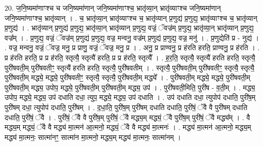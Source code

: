 \documentclass[17pt]{extarticle}
\begin{document}
20. ज॒नि॒ष्यमा॑णाꣳश्च च जनि॒ष्यमा॑णान् जनि॒ष्यमा॑णाꣳश्च॒ भ्रातृ॑व्या॒न् भ्रातृ॑व्याꣳश्च जनि॒ष्यमा॑णान् जनि॒ष्यमा॑णाꣳश्च॒ भ्रातृ॑व्यान् । . च॒ भ्रातृ॑व्या॒न् भ्रातृ॑व्याꣳश्च च॒ भ्रातृ॑व्यान् प्र॒णुद्य॑ प्र॒णुद्य॒ भ्रातृ॑व्याꣳश्च च॒ भ्रातृ॑व्यान् प्र॒णुद्य॑ । . भ्रातृ॑व्यान् प्र॒णुद्य॑ प्र॒णुद्य॒ भ्रातृ॑व्या॒न् भ्रातृ॑व्यान् प्र॒णुद्य॒ वज्रं॒ ॅवज्र॑म् प्र॒णुद्य॒ भ्रातृ॑व्या॒न् भ्रातृ॑व्यान् प्र॒णुद्य॒ वज्र᳚म् । . प्र॒णुद्य॒ वज्रं॒ ॅवज्र॑म् प्र॒णुद्य॑ प्र॒णुद्य॒ वज्र॒ मन्वनु॒ वज्र॑म् प्र॒णुद्य॑ प्र॒णुद्य॒ वज्र॒ मनु॑ । . प्र॒णुद्येति॑ प्र - नुद्य॑ । . वज्र॒ मन्वनु॒ वज्रं॒ ॅवज्र॒ मनु॒ प्र प्राणु॒ वज्रं॒ ॅवज्र॒ मनु॒ प्र । . अनु॒ प्र प्राण्वनु॒ प्र ह॑रति हरति॒ प्राण्वनु॒ प्र ह॑रति । . प्र ह॑रति हरति॒ प्र प्र ह॑रति॒ स्तृत्यै॒ स्तृत्यै॑ हरति॒ प्र प्र ह॑रति॒ स्तृत्यै᳚ । . ह॒र॒ति॒ स्तृत्यै॒ स्तृत्यै॑ हरति हरति॒ स्तृत्यै॒ पुरी॑षवती॒म् पुरी॑षवतीꣳ॒॒ स्तृत्यै॑ हरति हरति॒ स्तृत्यै॒ पुरी॑षवतीम् । . स्तृत्यै॒ पुरी॑षवती॒म् पुरी॑षवतीꣳ॒॒ स्तृत्यै॒ स्तृत्यै॒ पुरी॑षवती॒म् मद्ध्ये॒ मद्ध्ये॒ पुरी॑षवतीꣳ॒॒ स्तृत्यै॒ स्तृत्यै॒ पुरी॑षवती॒म् मद्ध्ये᳚ । . पुरी॑षवती॒म् मद्ध्ये॒ मद्ध्ये॒ पुरी॑षवती॒म् पुरी॑षवती॒म् मद्ध्य॒ उपोप॒ मद्ध्ये॒ पुरी॑षवती॒म् पुरी॑षवती॒म् मद्ध्य॒ उप॑ । . पुरी॑षवती॒मिति॒ पुरी॑ष - व॒ती॒म् । . मद्ध्य॒ उपोप॒ मद्ध्ये॒ मद्ध्य॒ उप॑ दधाति दधा॒ त्युप॒ मद्ध्ये॒ मद्ध्य॒ उप॑ दधाति । . उप॑ दधाति दधा॒ त्युपोप॑ दधाति॒ पुरी॑ष॒म् पुरी॑षम् दधा॒ त्युपोप॑ दधाति॒ पुरी॑षम् । . द॒धा॒ति॒ पुरी॑ष॒म् पुरी॑षम् दधाति दधाति॒ पुरी॑षं॒ ॅवै वै पुरी॑षम् दधाति दधाति॒ पुरी॑षं॒ ॅवै । . पुरी॑षं॒ ॅवै वै पुरी॑ष॒म् पुरी॑षं॒ ॅवै मद्ध्य॒म् मद्ध्यं॒ ॅवै पुरी॑ष॒म् पुरी॑षं॒ ॅवै मद्ध्य᳚म् । . वै मद्ध्य॒म् मद्ध्यं॒ ॅवै वै मद्ध्य॑ मा॒त्मन॑ आ॒त्मनो॒ मद्ध्यं॒ ॅवै वै मद्ध्य॑ मा॒त्मनः॑ । . मद्ध्य॑ मा॒त्मन॑ आ॒त्मनो॒ मद्ध्य॒म् मद्ध्य॑ मा॒त्मनः॒ सात्मा॑नꣳ॒॒ सात्मा॑न मा॒त्मनो॒ मद्ध्य॒म् मद्ध्य॑ मा॒त्मनः॒ सात्मा॑नम् । \newline
\end{document}
